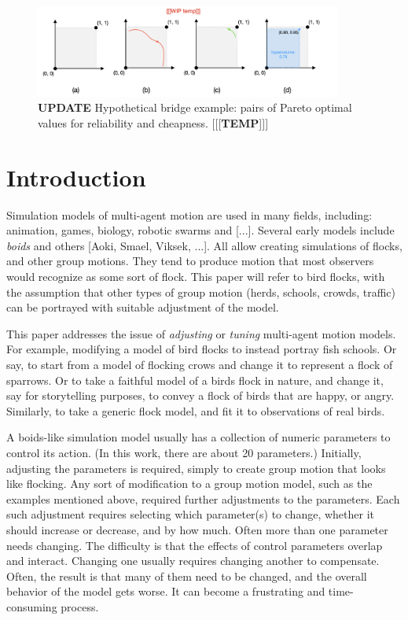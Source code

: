 \documentclass[letterpaper]{article}
\begin{document}

\begin{figure}[t]
    \centering
    \includegraphics[width=0.9\textwidth]{images/temp_MOF_HV.png}
    \caption{\textbf{UPDATE} Hypothetical bridge example: pairs of Pareto optimal values for reliability and cheapness. [[[\textbf{TEMP}]]]}
    \label{fig:MOF_HV}
\end{figure}

\section{Introduction}
\label{sec:intro}

Simulation models of multi-agent motion are used in many fields, including: animation, games, biology, robotic swarms and [...]. Several early models include \textit{boids} \citep{reynolds_flocks_1987} and others [Aoki, Smael, Viksek, ...]. All allow creating simulations of flocks, and other group motions.  They tend to produce motion that most observers would recognize as some sort of flock. This paper will refer to bird flocks, with the assumption that other types of group motion (herds, schools, crowds, traffic) can be portrayed with suitable adjustment of the model.

This paper addresses the issue of \textit{adjusting} or \textit{tuning} multi-agent motion models. For example, modifying a model of bird flocks to instead portray fish schools. Or say, to start from a model of flocking crows and change it to represent a flock of sparrows. Or to take a faithful model of a birds flock in nature, and change it, say for storytelling purposes, to convey a flock of birds that are happy, or angry. Similarly, to take a generic flock model, and fit it to observations of real birds.

A boids-like simulation model usually has a collection of numeric parameters to control its action. (In this work, there are about 20 parameters.) Initially, adjusting the parameters is required, simply to create group motion that looks like flocking. Any sort of modification to a group motion model, such as the examples mentioned above, required further adjustments to the parameters. Each such adjustment requires selecting which parameter(s) to change, whether it should increase or decrease, and by how much. Often more than one parameter needs changing. The difficulty is that the effects of control parameters overlap and interact. Changing one usually requires changing another to compensate. Often, the result is that many of them need to be changed, and the overall behavior of the model gets worse. It can become a frustrating and time-consuming process.
\end{document}
